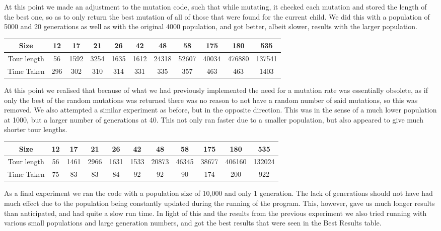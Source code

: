 \documentclass[11pt]{article}
\begin{document}
		\par 
		At this point we made an adjustment to the mutation code, such that while mutating, it checked each mutation and stored the length of the best one, so as to only return the best mutation of all of those that were found for the current child. We did this with a population of 5000 and 20 generations as well as with the original 4000 population, and got better, albeit slower, results with the larger population.
			\begin{center}
				\begin{tabular}{| c | c | c | c | c | c | c | c | c | c | c |}
					\hline
					Size & 12 & 17 & 21 & 26 & 42 & 48 & 58 & 175 & 180 & 535 \\
					\hline
					Tour length & 56 & 1592 & 3254 & 1635 & 1612 & 24318 & 52607 & 40034 & 476880 & 137541 \\
					\hline
					Time Taken & 296 & 302 & 310 & 314 & 331 & 335 & 357 & 463 & 463 & 1403 \\
					\hline		
				\end{tabular}
			\end{center}
		\par
		At this point we realised that because of what we had previously implemented the need for a mutation rate was essentially obsolete, as if only the best of the random mutations was returned there was no reason to not have a random number of said mutations, so this was removed. We also attempted a similar experiment as before, but in the opposite direction. This was in the sense of a much lower population at 1000, but a larger number of generations at 40. This not only ran faster due to a smaller population, but also appeared to give much shorter tour lengths.
			\begin{center}
				\begin{tabular}{| c | c | c | c | c | c | c | c | c | c | c |}
					\hline
					Size & 12 & 17 & 21 & 26 & 42 & 48 & 58 & 175 & 180 & 535 \\
					\hline
					Tour length & 56 & 1461 & 2966 & 1631 & 1533 & 20873 & 46345 & 38677 & 406160 & 132024 \\
					\hline
					Time Taken & 75 & 83 & 83 & 84 & 92 & 92 & 90 & 174 & 200 & 922 \\
					\hline		
				\end{tabular}
			\end{center}	
		\par
		As a final experiment we ran the code with a population size of 10,000 and only 1 generation. The lack of generations should not have had much effect due to the population being constantly updated during the running of the program. This, however, gave us much longer results than anticipated, and had quite a slow run time. In light of this and the results from the previous experiment we also tried running with various small populations and large generation numbers, and got the best results that were seen in the Best Results table.
\end{document}
